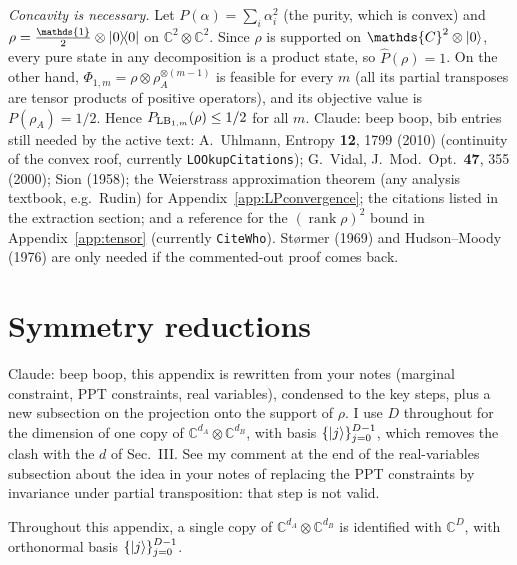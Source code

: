 \documentclass[aps,pra,twocolumn,showpacs,superscriptaddress,groupedaddress]{revtex4-2}
\newcommand{\one}[0]{\mathds{1}}
\renewcommand{\a}{\alpha}
\newcommand{\claude}[1]{{\color{claudeorange} Claude: beep boop, #1}}
\newcommand{\C}{\mathds{C}}
\newcommand{\I}{\one}
\begin{document}
\begin{widetext}
    \emph{Concavity is necessary.} Let $P(\a)=\sum_i\a_i^2$ (the purity, which is convex) and $\rho=\tfrac{\I}{2}\otimes\dyad{0}$ on $\C^2\otimes\C^2$. Since $\rho$ is supported on $\C^2\otimes\ket{0}$, every pure state in any decomposition is a product state, so $\widehat P(\rho)=1$. On the other hand, $\Phi_{1,m}=\rho\otimes\rho_A^{\otimes(m-1)}$ is feasible for every $m$ (all its partial transposes are tensor products of positive operators), and its objective value is $P(\rho_A)=1/2$. Hence $P_{{\rm LB}_{1,m}}(\rho)\leq1/2$ for all $m$.
\fi
\claude{bib entries still needed by the active text: A.~Uhlmann, Entropy \textbf{12}, 1799 (2010) (continuity of the convex roof, currently \texttt{LOOkupCitations}); G.~Vidal, J.\ Mod.\ Opt.\ \textbf{47}, 355 (2000); Sion (1958); the Weierstrass approximation theorem (any analysis textbook, e.g.\ Rudin) for Appendix~\ref{app:LPconvergence}; the citations listed in the extraction section; and a reference for the $(\operatorname{rank}\rho)^2$ bound in Appendix~\ref{app:tensor} (currently \texttt{CiteWho}). St{\o}rmer (1969) and Hudson--Moody (1976) are only needed if the commented-out proof comes back.}

\section{Symmetry reductions}\label{app:SymRed}
\claude{this appendix is rewritten from your notes (marginal constraint, PPT constraints, real variables), condensed to the key steps, plus a new subsection on the projection onto the support of $\rho$. I use $D$ throughout for the dimension of one copy of $\C^{d_A}\otimes\C^{d_B}$, with basis $\{\ket{j}\}_{j=0}^{D-1}$, which removes the clash with the $d$ of Sec.~III. See my comment at the end of the real-variables subsection about the idea in your notes of replacing the PPT constraints by invariance under partial transposition: that step is not valid.}

Throughout this appendix, a single copy of $\C^{d_A}\otimes\C^{d_B}$ is identified with $\C^D$, with orthonormal basis $\{\ket{j}\}_{j=0}^{D-1}$.


\end{widetext}
\end{document}
